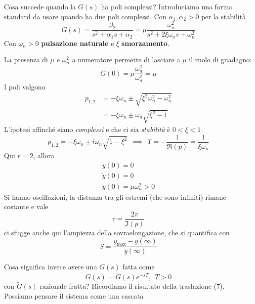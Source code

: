 Cosa succede quando la $G(s)$ ha poli complessi? Introduciamo una forma standard da usare quando ha due poli complessi. Con $\alpha _1 ,\alpha _2  >0$ per la stabilità
\begin{equation*}
	G(s) =\frac{\beta _2}{s^2 +\alpha _1 s+\alpha _2} =\mu \frac{\omega ^2_n}{s^2 +2\xi \omega _n s+\omega ^2_n}
\end{equation*}
Con $\omega _n  >0$ \textbf{pulsazione naturale} e $\xi $ \textbf{smorzamento}.

La presenza di $\mu $ e $\omega ^2_n$ a numeratore permette di lasciare a $\mu $ il ruolo di guadagno:
\begin{equation*}
	G(0) =\mu \frac{\omega ^2_n}{\omega ^2_n} =\mu 
\end{equation*}
I poli valgono
\begin{equation*}
	\begin{aligned}
		p_{1,2} & =-\xi \omega _n \pm \sqrt{\xi ^2 \omega ^2_n -\omega ^2_n} \\
		        & =-\xi \omega _n \pm \omega _n\sqrt{\xi ^2 -1}              
	\end{aligned}
\end{equation*}
L'ipotesi affinché siano \textit{complessi} e che ci sia \textit{stabilità} è $0< \xi < 1$
\begin{equation*}
	p_{1,2} =-\xi \omega _n \pm i\omega _n\sqrt{1-\xi ^2} \ \ \implies \ \ T=-\frac{1}{\Re(p)} =\frac{1}{\xi \omega _n}
\end{equation*}
Qui $r=2$, allora
\begin{gather*}
	y(0) =0\\
	\dot{y}(0) =0\\
	\ddot{y}(0) =\mu \omega ^2_n  >0
\end{gather*}
Si hanno oscillazioni, la distanza tra gli estremi (che sono infiniti) rimane costante e vale
\begin{equation*}
	\boxed{\tau =\frac{2\pi }{\Im(p)}}
\end{equation*}
ci sfugge anche qui l'ampiezza della sovraelongazione, che si quantifica con
\begin{equation*}
	\boxed{S=\frac{y_{\text{max}} -y(\infty)}{y(\infty)}}
\end{equation*}

Cosa significa invece avere una $G(s)$ fatta come
\begin{equation*}
	G(s) =\tilde{G}(s) e^{-sT} ,\ \ T >0
\end{equation*}
con $\tilde{G}(s)$ razionale fratta? Ricordiamo il risultato della traslazione (7). Possiamo pensare il sistema come una cascata

